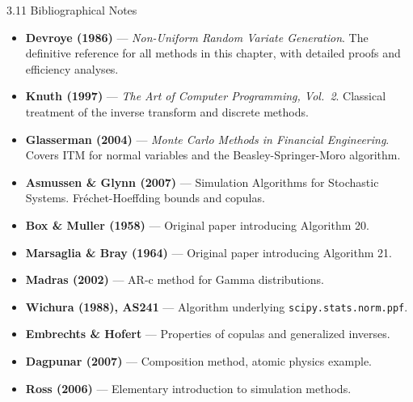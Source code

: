 \documentclass[aspectratio=169,10pt]{beamer}
\begin{document}
\begin{frame}{3.11 Bibliographical Notes}
  \begin{itemize}
    \item \textbf{Devroye (1986)} --- \textit{Non-Uniform Random Variate Generation}.
          The definitive reference for all methods in this chapter, with
          detailed proofs and efficiency analyses.
    \item \textbf{Knuth (1997)} --- \textit{The Art of Computer Programming, Vol.\ 2}.
          Classical treatment of the inverse transform and discrete methods.
    \item \textbf{Glasserman (2004)} --- \textit{Monte Carlo Methods in Financial Engineering}.
          Covers ITM for normal variables and the Beasley-Springer-Moro algorithm.
    \item \textbf{Asmussen \& Glynn (2007)} --- Simulation Algorithms for Stochastic Systems.
          Fr\'{e}chet-Hoeffding bounds and copulas.
    \item \textbf{Box \& Muller (1958)} --- Original paper introducing Algorithm 20.
    \item \textbf{Marsaglia \& Bray (1964)} --- Original paper introducing Algorithm 21.
    \item \textbf{Madras (2002)} --- AR-c method for Gamma distributions.
    \item \textbf{Wichura (1988), AS241} --- Algorithm underlying \texttt{scipy.stats.norm.ppf}.
    \item \textbf{Embrechts \& Hofert} --- Properties of copulas and generalized inverses.
    \item \textbf{Dagpunar (2007)} --- Composition method, atomic physics example.
    \item \textbf{Ross (2006)} --- Elementary introduction to simulation methods.
  \end{itemize}
\end{frame}
\end{document}
